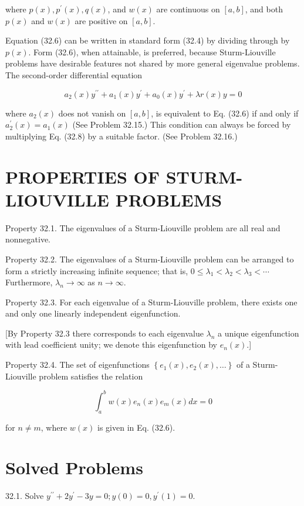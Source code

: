 \documentclass[10pt]{article}
\begin{document}
where $p(x), p^{\prime}(x), q(x)$, and $w(x)$ are continuous on $[a, b]$, and both $p(x)$ and $w(x)$ are positive on $[a, b]$.

Equation (32.6) can be written in standard form (32.4) by dividing through by $p(x)$. Form (32.6), when attainable, is preferred, because Sturm-Liouville problems have desirable features not shared by more general eigenvalue problems. The second-order differential equation


\begin{equation*}
a_{2}(x) y^{\prime \prime}+a_{1}(x) y^{\prime}+a_{0}(x) y^{\prime}+\lambda r(x) y=0 \tag{32.8}
\end{equation*}


where $a_{2}(x)$ does not vanish on $[a, b]$, is equivalent to Eq. (32.6) if and only if $a_{2}^{\prime}(x)=a_{1}(x)$ (See Problem 32.15.) This condition can always be forced by multiplying Eq. (32.8) by a suitable factor. (See Problem 32.16.)

\section*{PROPERTIES OF STURM-LIOUVILLE PROBLEMS}
Property 32.1. The eigenvalues of a Sturm-Liouville problem are all real and nonnegative.

Property 32.2. The eigenvalues of a Sturm-Liouville problem can be arranged to form a strictly increasing infinite sequence; that is, $0 \leq \lambda_{1}<\lambda_{2}<\lambda_{3}<\cdots$ Furthermore, $\lambda_{n} \rightarrow \infty$ as $n \rightarrow \infty$.

Property 32.3. For each eigenvalue of a Sturm-Liouville problem, there exists one and only one linearly independent eigenfunction.

[By Property 32.3 there corresponds to each eigenvalue $\lambda_{n}$ a unique eigenfunction with lead coefficient unity; we denote this eigenfunction by $e_{n}(x)$.]

Property 32.4. The set of eigenfunctions $\left\{e_{1}(x), e_{2}(x), \ldots\right\}$ of a Sturm-Liouville problem satisfies the relation


\begin{equation*}
\int_{a}^{b} w(x) e_{n}(x) e_{m}(x) d x=0 \tag{32.9}
\end{equation*}


for $n \neq m$, where $w(x)$ is given in Eq. (32.6).

\section*{Solved Problems}
32.1. Solve $y^{\prime \prime}+2 y^{\prime}-3 y=0 ; y(0)=0, y^{\prime}(1)=0$.
\end{document}
